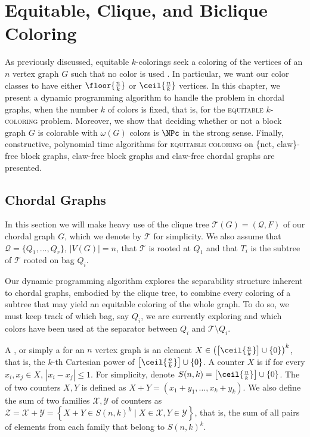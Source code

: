 \chapter{Equitable, Clique, and Biclique Coloring}
\label{ch:eq_coloring}

As previously discussed, equitable $k$-colorings seek a coloring of the vertices of an $n$ vertex graph $G$ such that no color is used . In particular, we want our color classes to have either $\floor{\frac{n}{k}}$ or $\ceil{\frac{n}{k}}$ vertices.
In this chapter, we present a dynamic programming algorithm to handle the problem in chordal graphs, when the number $k$ of colors is fixed, that is, for the \textsc{equitable $k$-coloring} problem.
Moreover, we show that deciding whether or not a block graph $G$ is colorable with $\omega(G)$ colors is $\NPc$ in the strong sense.
Finally, constructive, polynomial time algorithms for \textsc{equitable coloring} on \{net, claw\}-free block graphs, claw-free block graphs and claw-free chordal graphs are presented.

\section{Chordal Graphs}

In this section we will make heavy use of the clique tree $\mathcal{T}(G) = (\mathcal{Q}, F)$ of our chordal graph $G$, which we denote by $\mathcal{T}$ for simplicity.
We also assume that $\mathcal{Q} = \{Q_1, \dots, Q_r\}$, $|V(G)| = n$, that $\mathcal{T}$ is rooted at $Q_1$ and that $T_i$ is the subtree of $\mathcal{T}$ rooted on bag $Q_i$.

Our dynamic programming algorithm explores the separability structure inherent to chordal graphs, embodied by the clique tree, to combine every coloring of a subtree that may yield an equitable coloring of the whole graph.
To do so, we must keep track of which bag, say $Q_i$, we are currently exploring and which colors have been used at the separator between $Q_i$ and $\mathcal{T} \setminus Q_i$.

A , or simply a  for an $n$ vertex graph is an element $X \in \left(\left[\ceil{\frac{n}{k}}\right] \cup \{0\}\right)^k$, that is, the $k$-th Cartesian power of $\left[\ceil{\frac{n}{k}}\right] \cup \{0\}$.
A counter $X$ is  if for every $x_i, x_j \in X$, $|x_i - x_j| \leq 1$.
For simplicity, denote $S(n,k) = \left[\ceil{\frac{n}{k}}\right] \cup \{0\}$.
The  of two counters $X,Y$ is defined as $X + Y = (x_1 + y_1, \dots, x_k + y_k)$.
We also define the sum of two families $\mathcal{X}, \mathcal{Y}$ of counters as $\mathcal{Z} = \mathcal{X} + \mathcal{Y} = \left\{X + Y \in S(n,k)^k \mid X \in \mathcal{X}, Y \in \mathcal{Y} \right\}$, that is, the sum of all pairs of elements from each family that belong to $S(n,k)^k$.

